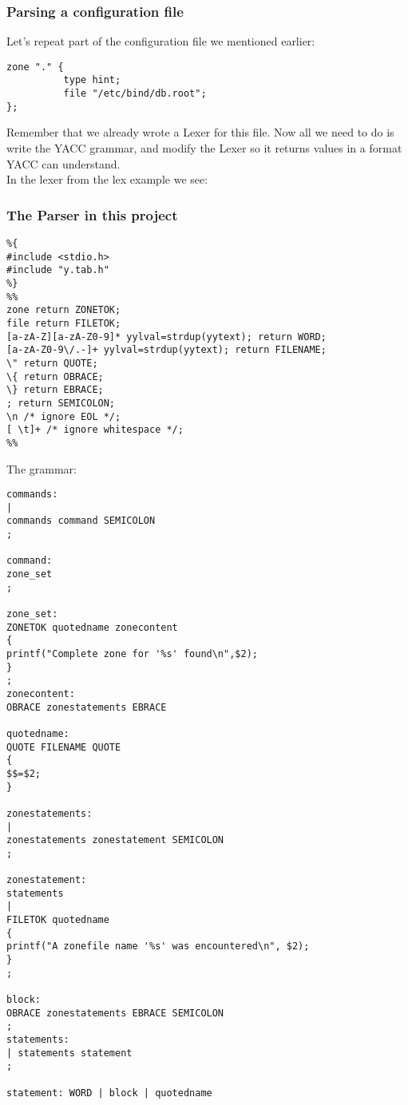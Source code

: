\documentclass{article}
\begin{document}
\subsubsection{Parsing a configuration file}
Let’s repeat part of the configuration file we mentioned earlier:
\begin{verbatim}
zone "." {
          type hint;
          file "/etc/bind/db.root";
};
\end{verbatim}
Remember that we already wrote a Lexer for this file. Now all we need to do is write the YACC grammar,
and modify the Lexer so it returns values in a format YACC can understand.\\
In the lexer from the lex example we see:




\subsubsection{The Parser in this project}
\begin{verbatim}
%{
#include <stdio.h>
#include "y.tab.h"
%}
%%
zone return ZONETOK;
file return FILETOK;
[a-zA-Z][a-zA-Z0-9]* yylval=strdup(yytext); return WORD;
[a-zA-Z0-9\/.-]+ yylval=strdup(yytext); return FILENAME;
\" return QUOTE;
\{ return OBRACE;
\} return EBRACE;
; return SEMICOLON;
\n /* ignore EOL */;
[ \t]+ /* ignore whitespace */;
%%
\end{verbatim}
The grammar:
\begin{verbatim}
commands:
|
commands command SEMICOLON
;

command:
zone_set
;

zone_set:
ZONETOK quotedname zonecontent
{
printf("Complete zone for '%s' found\n",$2);
}
;
zonecontent:
OBRACE zonestatements EBRACE

quotedname:
QUOTE FILENAME QUOTE
{
$$=$2;
}

zonestatements:
|
zonestatements zonestatement SEMICOLON
;

zonestatement:
statements
|
FILETOK quotedname
{
printf("A zonefile name '%s' was encountered\n", $2);
}
;

block:
OBRACE zonestatements EBRACE SEMICOLON
;
statements:
| statements statement
;

statement: WORD | block | quotedname
\end{verbatim}
\end{document}
